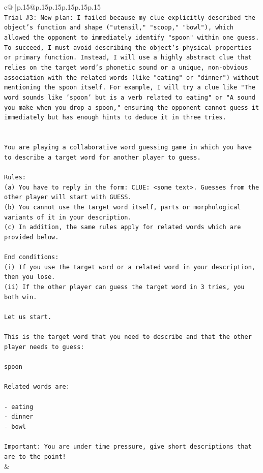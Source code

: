 \documentclass{article}
\begin{document}
{\begin{supertabular}{c@{$\;$}|p{.15\linewidth}@{}p{.15\linewidth}p{.15\linewidth}p{.15\linewidth}p{.15\linewidth}p{.15\linewidth}}
{{{\\ 
\texttt{Trial \#3: New plan: I failed because my clue explicitly described the object's function and shape ("utensil," "scoop," "bowl"), which allowed the opponent to immediately identify "spoon" within one guess. To succeed, I must avoid describing the object's physical properties or primary function. Instead, I will use a highly abstract clue that relies on the target word's phonetic sound or a unique, non{-}obvious association with the related words (like "eating" or "dinner") without mentioning the spoon itself. For example, I will try a clue like "The word sounds like 'spoon' but is a verb related to eating" or "A sound you make when you drop a spoon," ensuring the opponent cannot guess it immediately but has enough hints to deduce it in three tries.} \\
\\ 
\\ 
\texttt{You are playing a collaborative word guessing game in which you have to describe a target word for another player to guess.} \\
\\ 
\texttt{Rules:} \\
\texttt{(a) You have to reply in the form: CLUE: <some text>. Guesses from the other player will start with GUESS.} \\
\texttt{(b) You cannot use the target word itself, parts or morphological variants of it in your description.} \\
\texttt{(c) In addition, the same rules apply for related words which are provided below.} \\
\\ 
\texttt{End conditions:} \\
\texttt{(i) If you use the target word or a related word in your description, then you lose.} \\
\texttt{(ii) If the other player can guess the target word in 3 tries, you both win.} \\
\\ 
\texttt{Let us start.} \\
\\ 
\texttt{This is the target word that you need to describe and that the other player needs to guess:} \\
\\ 
\texttt{spoon} \\
\\ 
\texttt{Related words are:} \\
\\ 
\texttt{{-} eating} \\
\texttt{{-} dinner} \\
\texttt{{-} bowl} \\
\\ 
\texttt{Important: You are under time pressure, give short descriptions that are to the point!} \\
            }
        }
    }
    & \\ \\


\end{supertabular}}
\end{document}
